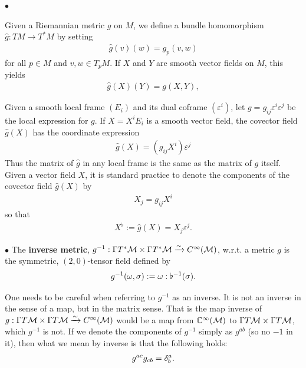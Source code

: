 \documentclass[12pt]{article} %
\begin{document}
$\bullet$ 

\begin{defa}
Given a Riemannian metric $g$ on $M$, we define a bundle homomorphism $\hat{g}: T M \rightarrow T^{*} M$ by setting
\begin{align*}
\widehat{g}(v)(w)=g_{p}(v, w)
\end{align*}
for all $p \in M$ and $v, w \in T_{p} M$. If $X$ and $Y$ are smooth vector fields on $M$, this yields
\begin{align*}
\widehat{g}(X)(Y)=g(X, Y),
\end{align*}
\end{defa}


Given a smooth local frame $\left(E_{i}\right)$ and its dual coframe $\left(\varepsilon^{i}\right)$, let $g=g_{i j} \varepsilon^{i} \varepsilon^{j}$ be the local expression for $g$. If $X=X^{i} E_{i}$ is a smooth vector field, the covector field $\widehat{g}(X)$ has the coordinate expression
\begin{align*}
\widehat{g}(X)=\left(g_{i j} X^{i}\right) \varepsilon^{j}
\end{align*}
Thus the matrix of $\hat{g}$ in any local frame is the same as the matrix of $g$ itself.
Given a vector field $X$, it is standard practice to denote the components of the covector field $\widehat{g}(X)$ by
\begin{align*}
X_{j}=g_{i j} X^{i}
\end{align*}
so that
\begin{align*}
X^{\flat}:=\widehat{g}(X)=X_{j} \varepsilon^{j}.
\end{align*}

$\bullet$ 
    The \textbf{inverse metric}, $g^{-1}:\Gamma T^*\mathcal{M}\times \Gamma T^*\mathcal{M}\xrightarrow{\sim} C^{\infty}(\mathcal{M})$, w.r.t. a metric $g$ is the symmetric, $(2,0)$-tensor field defined by 
    \begin{align*}
        g^{-1}(\omega,\sigma) := \omega : \flat^{-1}(\sigma).
    \end{align*}
\ed 

\br 
    One needs to be careful when referring to $g^{-1}$ as an inverse. It is not an inverse in the sense of a map, but in the matrix sense. That is the map inverse of $g:\Gamma T\mathcal{M}\times \Gamma T\mathcal{M}\xrightarrow{\sim} C^{\infty}(\mathcal{M})$ would be a map from $\mathbb{C}^{\infty}(\mathcal{M})$ to $\Gamma T\mathcal{M}\times\Gamma T\mathcal{M}$, which $g^{-1}$ is not. If we denote the components of $g^{-1}$ simply as $g^{ab}$ (so no $-1$ in it), then what we mean by inverse is that the following holds:
    \begin{align*}
        g^{ac}g_{cb} = \delta^a_b.
    \end{align*}
\er 
\end{document}
